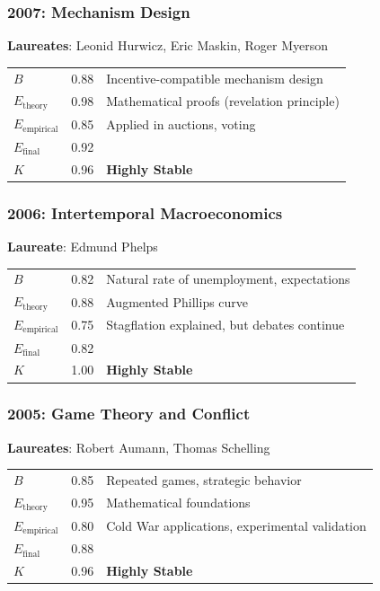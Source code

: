 \documentclass[11pt,a4paper]{article}
\begin{document}
\subsubsection{2007: Mechanism Design}
\textbf{Laureates}: Leonid Hurwicz, Eric Maskin, Roger Myerson

\begin{center}
\begin{tabular}{lcl}
\toprule
$B$ & 0.88 & Incentive-compatible mechanism design \\
$E_{\text{theory}}$ & 0.98 & Mathematical proofs (revelation principle) \\
$E_{\text{empirical}}$ & 0.85 & Applied in auctions, voting \\
\midrule
$E_{\text{final}}$ & 0.92 & \\
$K$ & 0.96 & \textbf{Highly Stable} \\
\bottomrule
\end{tabular}
\end{center}

\subsubsection{2006: Intertemporal Macroeconomics}
\textbf{Laureate}: Edmund Phelps

\begin{center}
\begin{tabular}{lcl}
\toprule
$B$ & 0.82 & Natural rate of unemployment, expectations \\
$E_{\text{theory}}$ & 0.88 & Augmented Phillips curve \\
$E_{\text{empirical}}$ & 0.75 & Stagflation explained, but debates continue \\
\midrule
$E_{\text{final}}$ & 0.82 & \\
$K$ & 1.00 & \textbf{Highly Stable} \\
\bottomrule
\end{tabular}
\end{center}

\subsubsection{2005: Game Theory and Conflict}
\textbf{Laureates}: Robert Aumann, Thomas Schelling

\begin{center}
\begin{tabular}{lcl}
\toprule
$B$ & 0.85 & Repeated games, strategic behavior \\
$E_{\text{theory}}$ & 0.95 & Mathematical foundations \\
$E_{\text{empirical}}$ & 0.80 & Cold War applications, experimental validation \\
\midrule
$E_{\text{final}}$ & 0.88 & \\
$K$ & 0.96 & \textbf{Highly Stable} \\
\bottomrule
\end{tabular}
\end{center}
\end{document}
